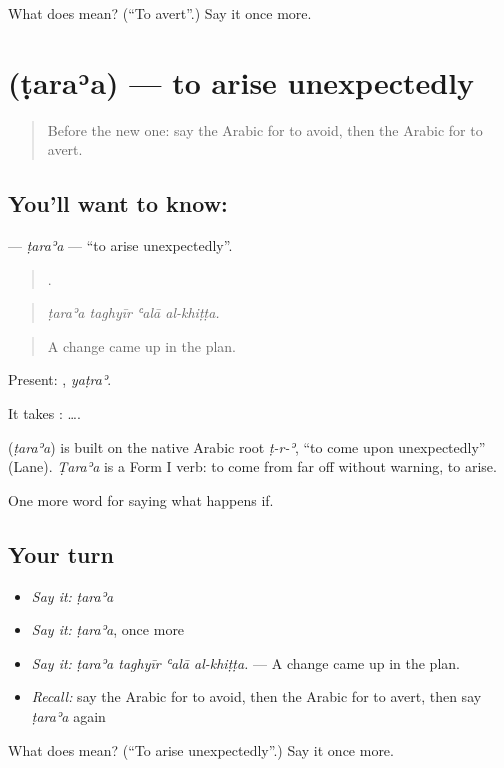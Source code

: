 \begin{tcolorbox}[breakable,colback=teal!4,colframe=teal!35!black,title={Before you move on}]
What does  mean? (\textquotedblleft{}To avert\textquotedblright{}.) Say it once more.
\end{tcolorbox}
\section[\texorpdfstring{\ar{طرأ} (ṭaraʾa)}{طرأ (ṭaraʾa)}]{ (ṭaraʾa) — to arise unexpectedly}

\label{lesson:AR-C407-taraa}



\begin{quote}
Before the new one: say the Arabic for to avoid, then the Arabic for to avert.
\end{quote}

\subsection*{You'll want to know: }
\textbf{} — \emph{ṭaraʾa} — \textquotedblleft{}to arise unexpectedly\textquotedblright{}.

\begin{quote}
   .
\end{quote}

\begin{quote}
\emph{ṭaraʾa taghyīr ʿalā al-khiṭṭa.}
\end{quote}

\begin{quote}
A change came up in the plan.
\end{quote}

Present: , \emph{yaṭraʾ}.

It takes :   ….

\begin{cousinweb}
\textbf{} (\emph{ṭaraʾa}) is built on the native Arabic root \emph{ṭ-r-ʾ}, \textquotedblleft{}to come upon unexpectedly\textquotedblright{} (Lane). \emph{Ṭaraʾa} is a Form I verb: to come from far off without warning, to arise.
\end{cousinweb}

\begin{grammarlens}[title={What you've built}]
One more word for saying what happens if.
\end{grammarlens}

\subsection*{Your turn}
\begin{itemize}
\raggedright
  \item \emph{Say it:} \emph{ṭaraʾa}
  \item \emph{Say it:} \emph{ṭaraʾa}, once more
  \item \emph{Say it:} \emph{ṭaraʾa taghyīr ʿalā al-khiṭṭa.} — A change came up in the plan.
  \item \emph{Recall:} say the Arabic for to avoid, then the Arabic for to avert, then say \emph{ṭaraʾa} again
\end{itemize}

\begin{tcolorbox}[breakable,colback=teal!4,colframe=teal!35!black,title={Before you move on}]
What does  mean? (\textquotedblleft{}To arise unexpectedly\textquotedblright{}.) Say it once more.
\end{tcolorbox}
